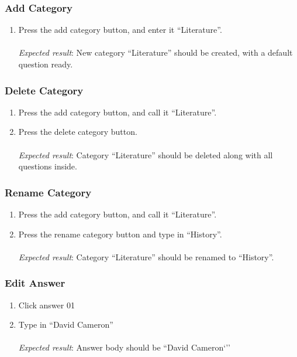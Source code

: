 \subsubsection{Add Category}
\begin{enumerate}[leftmargin=*]
\item Press the add category button, and enter it ``Literature''.\\\\
\textit{Expected result}: New category ``Literature'' should be created, with a default question ready.
\end{enumerate}

\subsubsection{Delete Category}
\begin{enumerate}[leftmargin=*]
\item Press the add category button, and call it ``Literature''.
\item Press the delete category button.\\\\
\textit{Expected result}: Category ``Literature'' should be deleted along with all questions inside.
\end{enumerate}

\subsubsection{Rename Category}
\begin{enumerate}[leftmargin=*]
\item Press the add category button, and call it ``Literature''.
\item Press the rename category button and type in ``History''.\\\\
\textit{Expected result}: Category ``Literature'' should be renamed to ``History''.
\end{enumerate}

\subsubsection{Edit Answer}
\begin{enumerate}[leftmargin=*]
\item Click answer 01
\item Type in ``David Cameron''\\\\
\textit{Expected result}: Answer body should be ``David Cameron`''
\end{enumerate}

